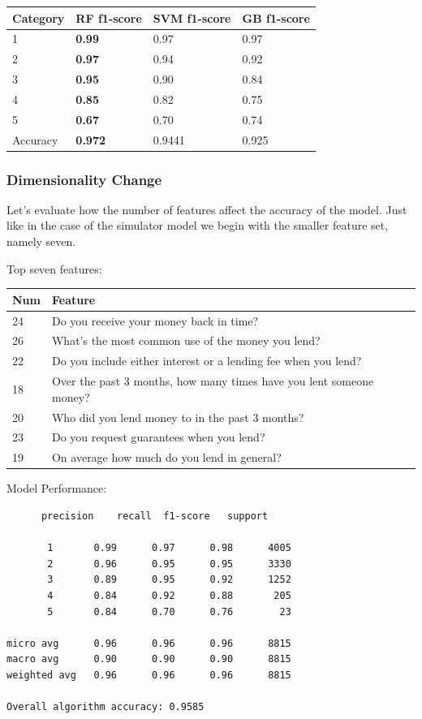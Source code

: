 \begin{longtable}[]{@{}llll@{}}
\toprule
Category & \textbf{RF f1-score} & SVM f1-score & GB
f1-score\tabularnewline
\midrule
\endhead
1 & \textbf{0.99} & 0.97 & 0.97\tabularnewline
2 & \textbf{0.97} & 0.94 & 0.92\tabularnewline
3 & \textbf{0.95} & 0.90 & 0.84\tabularnewline
4 & \textbf{0.85} & 0.82 & 0.75\tabularnewline
5 & \textbf{0.67} & 0.70 & 0.74\tabularnewline
Accuracy & \textbf{0.972} & 0.9441 & 0.925\tabularnewline
\bottomrule
\end{longtable}

\hypertarget{dimensionality-change-1}{%
\subsubsection{Dimensionality Change}\label{dimensionality-change-1}}

Let's evaluate how the number of features affect the accuracy of the
model. Just like in the case of the simulator model we begin with the
smaller feature set, namely seven.

Top seven features:

\begin{longtable}[]{@{}ll@{}}
\toprule
Num & Feature\tabularnewline
\midrule
\endhead
24 & Do you receive your money back in time?\tabularnewline
26 & What's the most common use of the money you lend?\tabularnewline
22 & Do you include either interest or a lending fee when you
lend?\tabularnewline
18 & Over the past 3 months, how many times have you lent someone
money?\tabularnewline
20 & Who did you lend money to in the past 3 months?\tabularnewline
23 & Do you request guarantees when you lend?\tabularnewline
19 & On average how much do you lend in general?\tabularnewline
\bottomrule
\end{longtable}

Model Performance:

\begin{verbatim}
      precision    recall  f1-score   support

       1       0.99      0.97      0.98      4005
       2       0.96      0.95      0.95      3330
       3       0.89      0.95      0.92      1252
       4       0.84      0.92      0.88       205
       5       0.84      0.70      0.76        23

micro avg      0.96      0.96      0.96      8815
macro avg      0.90      0.90      0.90      8815
weighted avg   0.96      0.96      0.96      8815 

Overall algorithm accuracy: 0.9585    
\end{verbatim}

